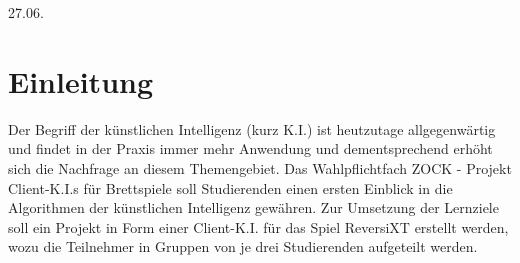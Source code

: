 \documentclass[12pt,a4paper,bibliography=totocnumbered,listof=totocnumbered]{article}
\begin{document}
{27.06.\the\year}

\setcounter{page}{1} 
\tableofcontents
\pagebreak



\renewcommand{\sectionmark}[1]{\markright{#1}}
\renewcommand{\subsectionmark}[1]{}
\renewcommand{\subsubsectionmark}[1]{}
\rhead{\rightmark}

\onehalfspacing
\renewcommand{\thesection}{\arabic{section}}
\renewcommand{\theHsection}{\arabic{section}}
\setcounter{section}{0}
\setcounter{page}{1}

\section{Einleitung} \label{kap:Einleitung}
Der Begriff der \glqq künstlichen Intelligenz\grqq{} (kurz K.I.) ist heutzutage allgegenwärtig und findet in der Praxis immer mehr Anwendung und dementsprechend erhöht sich die Nachfrage an diesem Themengebiet.\cite{ki} Das Wahlpflichtfach \glqq ZOCK - Projekt Client-K.I.s für Brettspiele\grqq{} soll Studierenden einen ersten Einblick in die Algorithmen der künstlichen Intelligenz gewähren. Zur Umsetzung der Lernziele soll ein Projekt in Form einer Client-K.I. für das Spiel ReversiXT erstellt werden, wozu die Teilnehmer in Gruppen von je drei Studierenden aufgeteilt werden. 
\end{document}
